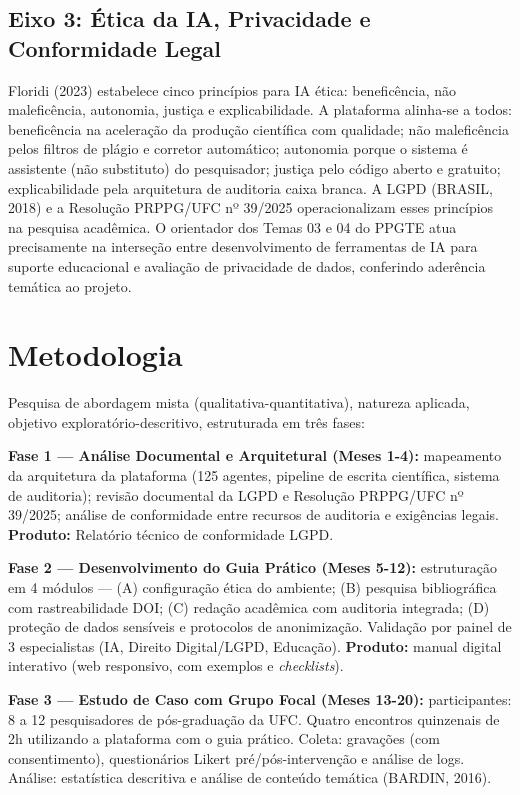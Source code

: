 \documentclass[12pt,a4paper]{article}
\begin{document}
\subsection{Eixo 3: Ética da IA, Privacidade e Conformidade Legal}

Floridi (2023) estabelece cinco princípios para IA ética: beneficência, não maleficência, autonomia, justiça e explicabilidade. A plataforma alinha-se a todos: beneficência na aceleração da produção científica com qualidade; não maleficência pelos filtros de plágio e corretor automático; autonomia porque o sistema é assistente (não substituto) do pesquisador; justiça pelo código aberto e gratuito; explicabilidade pela arquitetura de auditoria caixa branca. A LGPD (BRASIL, 2018) e a Resolução PRPPG/UFC nº 39/2025 operacionalizam esses princípios na pesquisa acadêmica. O orientador dos Temas 03 e 04 do PPGTE atua precisamente na interseção entre desenvolvimento de ferramentas de IA para suporte educacional e avaliação de privacidade de dados, conferindo aderência temática ao projeto.

\section{Metodologia}

Pesquisa de abordagem mista (qualitativa-quantitativa), natureza aplicada, objetivo exploratório-descritivo, estruturada em três fases:

\noindent\textbf{Fase 1 --- Análise Documental e Arquitetural (Meses 1-4):} mapeamento da arquitetura da plataforma (125 agentes, pipeline de escrita científica, sistema de auditoria); revisão documental da LGPD e Resolução PRPPG/UFC nº 39/2025; análise de conformidade entre recursos de auditoria e exigências legais. \textbf{Produto:} Relatório técnico de conformidade LGPD.

\noindent\textbf{Fase 2 --- Desenvolvimento do Guia Prático (Meses 5-12):} estruturação em 4 módulos --- (A) configuração ética do ambiente; (B) pesquisa bibliográfica com rastreabilidade DOI; (C) redação acadêmica com auditoria integrada; (D) proteção de dados sensíveis e protocolos de anonimização. Validação por painel de 3 especialistas (IA, Direito Digital/LGPD, Educação). \textbf{Produto:} manual digital interativo (web responsivo, com exemplos e \textit{checklists}).

\noindent\textbf{Fase 3 --- Estudo de Caso com Grupo Focal (Meses 13-20):} participantes: 8 a 12 pesquisadores de pós-graduação da UFC. Quatro encontros quinzenais de 2h utilizando a plataforma com o guia prático. Coleta: gravações (com consentimento), questionários Likert pré/pós-intervenção e análise de logs. Análise: estatística descritiva e análise de conteúdo temática (BARDIN, 2016).
\end{document}
